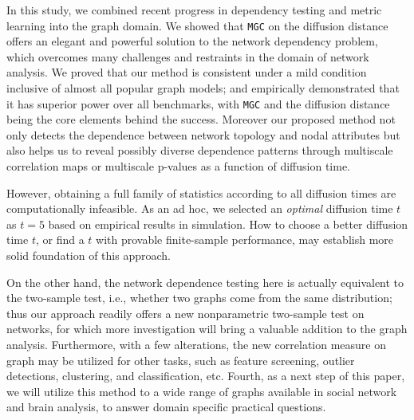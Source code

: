 \documentclass[11pt]{article}
\theoremstyle{definition}
\begin{document}
	In this study, we combined recent progress in dependency testing and metric learning into the graph domain. We showed that \texttt{MGC} on the diffusion distance offers an elegant and powerful solution to the network dependency problem, which overcomes many challenges and restraints in the domain of network analysis. We proved that our method is consistent under a mild condition inclusive of almost all popular graph models; and empirically demonstrated that it has superior power over all benchmarks, with \texttt{MGC} and the diffusion distance being the core elements behind the success. Moreover our proposed method not only detects the dependence between network topology and nodal attributes but also helps us to reveal possibly diverse dependence patterns through multiscale correlation maps or multiscale p-values as a function of diffusion time. 
	
	However, obtaining a full family of statistics according to all diffusion times are computationally infeasible. As an ad hoc, we selected an \textit{optimal} diffusion time $t$ as $t=5$ based on empirical results in simulation. How to choose a better diffusion time $t$, or find a $t$ with provable finite-sample performance, may establish more solid foundation of this approach. 
	
	On the other hand, the network dependence testing here is actually equivalent to the two-sample test, i.e., whether two graphs come from the same distribution; thus our approach readily offers a new nonparametric two-sample test on networks, for which more investigation will bring a valuable addition to the graph analysis. Furthermore, with a few alterations, the new correlation measure on graph may be utilized for other tasks, such as feature screening, outlier detections, clustering, and classification, etc. Fourth, as a next step of this paper, we will utilize this method to a wide range of graphs available in social network and brain analysis, to answer domain specific practical questions.
	
	
\end{document}
